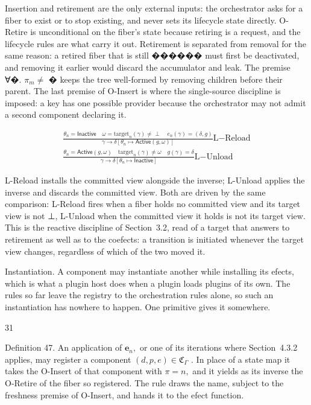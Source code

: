 \documentclass[
  10
]{article}
\begin{document}
Insertion and retirement are the only external inputs: the orchestrator
asks for a fiber to exist or to stop existing, and never sets its
lifecycle state directly. O-Retire is unconditional on the fiber's state
because retiring is a request, and the lifecycle rules are what carry it
out. Retirement is separated from removal for the same reason: a retired
fiber that is still ������ must first be deactivated, and removing it
earlier would discard the accumulator and leak. The premise ∀�.
\(\pi _ { m } \neq\) � keeps the tree well-formed by removing children
before their parent. The last premise of O-Insert is where the
single-source discipline is imposed: a key has one possible provider
because the orchestrator may not admit a second component declaring it.

\[
\begin{array} { r } { \frac { \theta _ { n } = \mathsf { I n a c t i v e } \quad \omega = \mathrm { t a r g e t } _ { n } ( \gamma ) \neq \perp \quad e _ { n } ( \gamma ) = ( \delta , g ) } { \gamma \longrightarrow \delta [ \theta _ { n } \mapsto \mathsf { A c t i v e } ( g , \omega ) ] } \mathrm { L } \mathrm { - R e l o a d } } \\ { \frac { \theta _ { n } = \mathsf { A c t i v e } ( g , \omega ) \quad \mathrm { t a r g e t } _ { n } ( \gamma ) \neq \omega \quad g ( \gamma ) = \delta } { \gamma \longrightarrow \delta [ \theta _ { n } \mapsto \mathsf { I n a c t i v e } ] } \mathrm { L } \mathrm { - U n l o a d } } \end{array}
\]

L-Reload installs the committed view alongside the inverse; L-Unload
applies the inverse and discards the committed view. Both are driven by
the same comparison: L-Reload fires when a fiber holds no committed view
and its target view is not ⊥, L-Unload when the committed view it holds
is not its target view. This is the reactive discipline of Section~3.2,
read of a target that answers to retirement as well as to the coefects:
a transition is initiated whenever the target view changes, regardless
of which of the two moved it.

Instantiation. A component may instantiate another while installing its
efects, which is what a plugin host does when a plugin loads plugins of
its own. The rules so far leave the registry to the orchestration rules
alone, so such an instantiation has nowhere to happen. One primitive
gives it somewhere.

31

Definition 47. An application of \(\boldsymbol { e } _ { n } ,\) or one
of its iterations where Section~4.3.2 applies, may register a component
\(( d , p , e ) \in \mathfrak { C } _ { \Gamma }\) . In place of a state
map it takes the O-Insert of that component with \(\pi = n ,\) and it
yields as its inverse the O-Retire of the fiber so registered. The rule
draws the name, subject to the freshness premise of O-Insert, and hands
it to the efect function.
\end{document}
